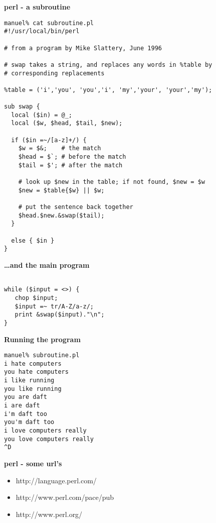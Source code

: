 %
%
\begin{slide}{}
{\small
{\bf perl - a subroutine}

\begin{verbatim}
manuel% cat subroutine.pl
#!/usr/local/bin/perl

# from a program by Mike Slattery, June 1996

# swap takes a string, and replaces any words in %table by 
# corresponding replacements

%table = ('i','you', 'you','i', 'my','your', 'your','my');

sub swap {
  local ($in) = @_;
  local ($w, $head, $tail, $new);

  if ($in =~/[a-z]+/) {
    $w = $&;    # the match
    $head = $`; # before the match
    $tail = $'; # after the match

    # look up $new in the table; if not found, $new = $w
    $new = $table{$w} || $w;

    # put the sentence back together
    $head.$new.&swap($tail); 
  }

  else { $in }
}
\end{verbatim}
}
\end{slide}
%
%
\begin{slide}{}
{\bf \ldots and the main program}

\begin{verbatim}

while ($input = <>) {
   chop $input;
   $input =~ tr/A-Z/a-z/;
   print &swap($input)."\n";
}

\end{verbatim}
\end{slide}

%
%
\begin{slide}{}

{\bf Running the program}

\begin{verbatim}
manuel% subroutine.pl
i hate computers
you hate computers
i like running
you like running
you are daft
i are daft
i'm daft too
you'm daft too
i love computers really
you love computers really
^D
\end{verbatim}
\end{slide}


%
%
\begin{slide}{}
{\bf perl - some url's}

\begin{itemize}
\item http://language.perl.com/
\item http://www.perl.com/pace/pub
\item http://www.perl.org/
\end{itemize}

\end{slide}




